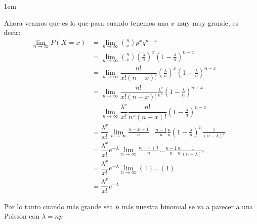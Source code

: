 \documentclass[12pt, fleqn]{report}                             %
\newenvironment{SmallIndentation}[1][0.75em]                    %
        {\begin{adjustwidth}{#1}{}\begin{footnotesize}}             %
        {\end{footnotesize}\end{adjustwidth}}                       %
\theoremstyle{break}                                            %
\newcommand{\Wrap}[1]{\left( #1 \right)}                        %
\begin{document}
\begin{SmallIndentation}[1em]
                    Ahora veamos que es lo que pasa cuando tenemos una $x$ muy muy grande, es decir:
                    \begin{align*}
                        \lim_{n \to \infty} P(X = x) 
                            &= \lim_{n \to \infty} {n \choose x}p^x q^{n - x}                                                               \\
                            &= \lim_{n \to \infty} {n \choose x}\Wrap{\frac{\lambda}{n}}^x \Wrap{1 - \frac{\lambda}{n}}^{n - x}             \\
                            &= \lim_{n \to \infty} \dfrac{n!}{x!(n - x)!} \Wrap{\frac{\lambda}{n}}^x \Wrap{1 - \frac{\lambda}{n}}^{n - x}   \\
                            &= \lim_{n \to \infty} \dfrac{n!}{x!(n - x)!} \frac{\lambda^x}{n^x} \Wrap{1 - \frac{\lambda}{n}}^{n - x}        \\
                            &= \lim_{n \to \infty} \dfrac{\lambda^x}{x!} 
                                \dfrac{n!}{n^x(n - x)!} \Wrap{1 - \frac{\lambda}{n}}^{n - x}                                                \\
                            &= \dfrac{\lambda^x}{x!}  \lim_{n \to \infty} 
                                \frac{n - x + 1}{n} \dots \frac{n - 1}{n}  \frac{n}{n} \Wrap{1 - \frac{\lambda}{n}}^{n} \frac{1}{(n - \lambda)^x} \\
                            &= \dfrac{\lambda^x}{x!} e^{-\lambda} \lim_{n \to \infty} 
                                \frac{n - x + 1}{n} \dots \frac{n - 1}{n}  \frac{n}{n} \frac{1}{(n - \lambda)^x} \\
                            &= \dfrac{\lambda^x}{x!} e^{-\lambda} \lim_{n \to \infty} 
                                (1) \dots (1)  \\
                            &= \dfrac{\lambda^x}{x!} e^{-\lambda} 
                    \end{align*}

                    Por lo tanto cuando más grande sea $n$ más nuestra binomial se va a parecer a una Poisson con $\lambda = np$

                \end{SmallIndentation}
                

            \clearpage
\end{document}
